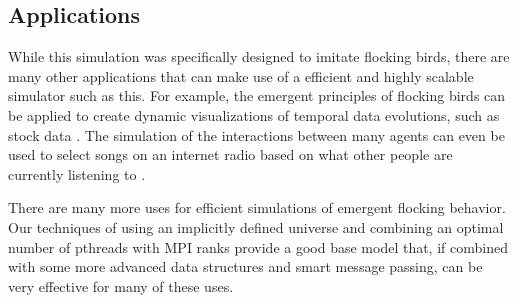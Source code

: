 \subsection*{Applications}
While this simulation was specifically designed to imitate flocking
birds, there are many other applications that can make use of a
efficient and highly scalable simulator such as this. For example, the
emergent principles of flocking birds can be applied to create dynamic
visualizations of temporal data evolutions, such as stock
data \cite{Moere}. The simulation of the interactions between many
agents can even be used to select songs on an internet radio based on
what other people are currently listening to \cite{Ibáñez}.

There are many more uses for efficient simulations of emergent flocking behavior.
Our techniques of using an implicitly defined universe and combining
an optimal number of pthreads with MPI ranks provide a good base model that, if
combined with some more advanced data structures and smart message passing, can
be very effective for many of these uses.
